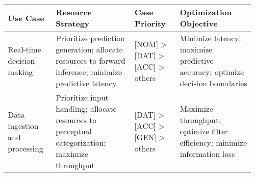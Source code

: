 \begin{longtable}[]{@{}llll@{}}
\toprule
\begin{minipage}[b]{0.13\columnwidth}\raggedright
Use Case\strut
\end{minipage} & \begin{minipage}[b]{0.24\columnwidth}\raggedright
Resource Strategy\strut
\end{minipage} & \begin{minipage}[b]{0.19\columnwidth}\raggedright
Case Priority\strut
\end{minipage} & \begin{minipage}[b]{0.32\columnwidth}\raggedright
Optimization Objective\strut
\end{minipage}\tabularnewline
\midrule
\endhead
\begin{minipage}[t]{0.13\columnwidth}\raggedright
Real-time decision making\strut
\end{minipage} & \begin{minipage}[t]{0.24\columnwidth}\raggedright
Prioritize prediction generation; allocate resources to forward
inference; minimize predictive latency\strut
\end{minipage} & \begin{minipage}[t]{0.19\columnwidth}\raggedright
{[}NOM{]} \textgreater{} {[}DAT{]} \textgreater{} {[}ACC{]}
\textgreater{} others\strut
\end{minipage} & \begin{minipage}[t]{0.32\columnwidth}\raggedright
Minimize latency; maximize predictive accuracy; optimize decision
boundaries\strut
\end{minipage}\tabularnewline
\begin{minipage}[t]{0.13\columnwidth}\raggedright
Data ingestion and processing\strut
\end{minipage} & \begin{minipage}[t]{0.24\columnwidth}\raggedright
Prioritize input handling; allocate resources to perceptual
categorization; maximize throughput\strut
\end{minipage} & \begin{minipage}[t]{0.19\columnwidth}\raggedright
{[}DAT{]} \textgreater{} {[}ACC{]} \textgreater{} {[}GEN{]}
\textgreater{} others\strut
\end{minipage} & \begin{minipage}[t]{0.32\columnwidth}\raggedright
Maximize throughput; optimize filter efficiency; minimize information
loss\strut
\end{minipage}\tabularnewline

\end{longtable}
